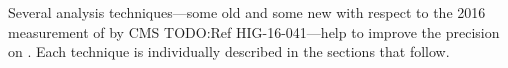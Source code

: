 Several analysis techniques---some old and some new with respect to the 2016 measurement of \mH by CMS TODO:Ref HIG-16-041---help to improve the precision on \mH.
Each technique is individually described in the sections that follow.





